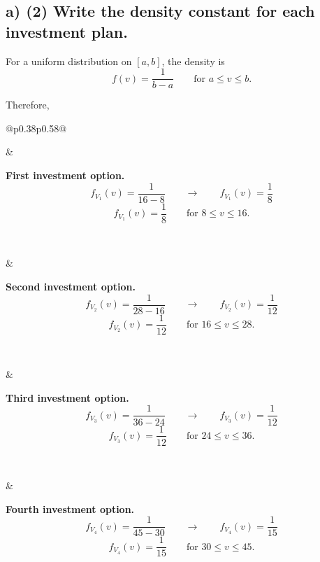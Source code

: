 \subsection*{a) \textbf{(2)} Write the density constant for each investment plan.}
\label{subsec:first-investment-product-resale-plans-c1-a}
For a uniform distribution on $[a,b]$, the density is
\[
f(v)=\frac{1}{b-a}\qquad \text{for }a\le v\le b.
\]

Therefore,

\begin{center}
	\setlength{\tabcolsep}{3pt}
	\renewcommand{\arraystretch}{1.08}
	\begin{tabular}{@{}p{0.38\textwidth}p{0.58\textwidth}@{}}
		\begin{minipage}[c]{\linewidth}
			\centering
		\end{minipage}
		&
		\begin{minipage}[c]{\linewidth}
			\textbf{First investment option.}
			\[
			f_{V_1}(v)=\frac{1}{16-8}
			\qquad \longrightarrow \qquad
			f_{V_1}(v)=\frac18
			\]
			\[
			f_{V_1}(v)=\frac18 \qquad \text{for }8\le v\le 16.
			\]
		\end{minipage}
		\\[0.4em]
		
		\begin{minipage}[c]{\linewidth}
			\centering
		\end{minipage}
		&
		\begin{minipage}[c]{\linewidth}
			\textbf{Second investment option.}
			\[
			f_{V_2}(v)=\frac{1}{28-16}
			\qquad \longrightarrow \qquad
			f_{V_2}(v)=\frac{1}{12}
			\]
			\[
			f_{V_2}(v)=\frac{1}{12} \qquad \text{for }16\le v\le 28.
			\]
		\end{minipage}
		\\[0.4em]
		
		\begin{minipage}[c]{\linewidth}
			\centering
		\end{minipage}
		&
		\begin{minipage}[c]{\linewidth}
			\textbf{Third investment option.}
			\[
			f_{V_3}(v)=\frac{1}{36-24}
			\qquad \longrightarrow \qquad
			f_{V_3}(v)=\frac{1}{12}
			\]
			\[
			f_{V_3}(v)=\frac{1}{12} \qquad \text{for }24\le v\le 36.
			\]
		\end{minipage}
		\\[0.4em]
		
		\begin{minipage}[c]{\linewidth}
			\centering
		\end{minipage}
		&
		\begin{minipage}[c]{\linewidth}
			\textbf{Fourth investment option.}
			\[
			f_{V_4}(v)=\frac{1}{45-30}
			\qquad \longrightarrow \qquad
			f_{V_4}(v)=\frac{1}{15}
			\]
			\[
			f_{V_4}(v)=\frac{1}{15} \qquad \text{for }30\le v\le 45.
			\]
		\end{minipage}
	\end{tabular}
\end{center}

